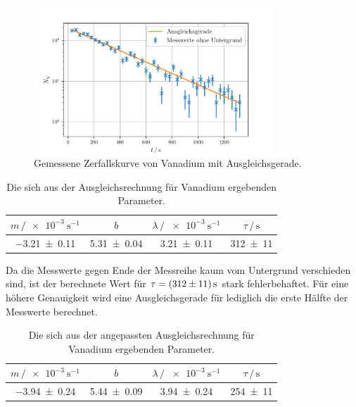\begin{figure}
    \centering
    \includegraphics[width=0.8\textwidth]{plots/Vanadium_Ausgleich.pdf}
    \caption{Gemessene Zerfallskurve von Vanadium mit Ausgleichsgerade.}
    \label{fig:VanadiumMess}
\end{figure}

\begin{table}
    \centering
    \caption{Die sich aus der Ausgleichsrechnung für Vanadium ergebenden Parameter.}
    \label{tab:paramsVanadium}
    \begin{tabular}{c c c c}
        \toprule
        $m\,/\SI{e-3}{\second\tothe{-1}}$ & $b$ & $\lambda\,/\,\SI{e-3}{\second\tothe{-1}}$ & $\tau\,/\,\si{\second}$ \\
        \midrule
        \num{-3.21+-0.11} & \num{5.31+-0.04} & \num{3.21+-0.11} & \num{312+-11} \\
        \bottomrule
    \end{tabular}
\end{table}

Da die Messwerte gegen Ende der Messreihe kaum vom Untergrund verschieden sind, ist der berechnete Wert für $\tau = \SI{312\pm11}{\second}$ stark fehlerbehaftet.
Für eine höhere Genauigkeit wird eine Ausgleichsgerade für lediglich die erste Hälfte der Messwerte berechnet.

\begin{table}
    \centering
    \caption{Die sich aus der angepassten Ausgleichsrechnung für Vanadium ergebenden Parameter.}
    \label{tab:paramsVanadiumNeu}
    \begin{tabular}{c c c c}
        \toprule
        $m\,/\SI{e-3}{\second\tothe{-1}}$ & $b$ & $\lambda\,/\,\SI{e-3}{\second\tothe{-1}}$ & $\tau\,/\,\si{\second}$ \\
        \midrule
        \num{-3.94+-0.24} & \num{5.44+-0.09} & \num{3.94+-0.24} & \num{254+-11} \\
        \bottomrule
    \end{tabular}
\end{table}

